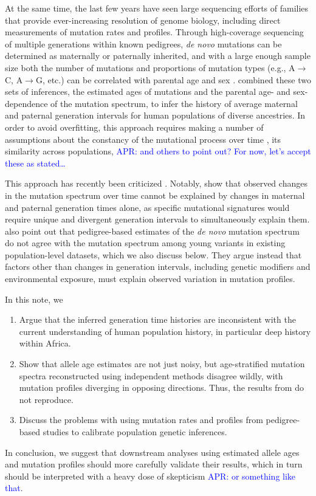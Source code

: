 \documentclass[]{article}
\newcommand{\aprcomment}[1]{{\textcolor{blue}{APR: #1}}}
\begin{document}
At the same time, the last few years have seen large sequencing efforts of
families that provide ever-increasing resolution of genome biology, including
direct measurements of mutation rates and profiles. Through high-coverage
sequencing of multiple generations within known pedigrees, \emph{de novo}
mutations can be determined as maternally or paternally inherited, and with a
large enough sample size both the number of mutations and proportions of
mutation types (e.g., A$\rightarrow$C, A$\rightarrow$G, etc.) can be correlated
with parental age and sex
\citep{jonsson2017parental,halldorsson2019characterizing}.
\citet{wang2023human} combined these two sets of inferences, the estimated ages
of mutations and the parental age- and sex-dependence of the mutation spectrum,
to infer the history of average maternal and paternal generation intervals for
human populations of diverse ancestries. In order to avoid overfitting, this
approach requires making a number of assumptions about the constancy of the
mutational process over time \cite{harris,dewitt}, its similarity across
populations, \aprcomment{and others to point out? For now, let's accept these
as stated\ldots}

This approach has recently been criticized \citep{gao2022limited}. Notably,
\citeauthor{gao2022limited} show that observed changes in the mutation spectrum
over time cannot be explained by changes in maternal and paternal generation
times alone, as specific mutational signatures would require unique and
divergent generation intervals to simultaneously explain them.
\citeauthor{gao2022limited} also point out that pedigree-based estimates of the
\emph{de novo} mutation spectrum do not agree with the mutation spectrum among
young variants in existing population-level datasets, which we also discuss
below. They argue instead that factors other than changes in generation
intervals, including genetic modifiers and environmental exposure, must explain
observed variation in mutation profiles.

In this note, we
\begin{enumerate}
    \item Argue that the inferred generation time histories are inconsistent
        with the current understanding of human population history, in
        particular deep history within Africa.
    \item Show that allele age estimates are not just noisy, but age-stratified
        mutation spectra reconstructed using independent methods disagree
        wildly, with mutation profiles diverging in opposing directions. Thus,
        the results from \citet{wang2023human} do not reproduce.
    \item Discuss the problems with using mutation rates and profiles from
        pedigree-based studies to calibrate population genetic inferences.
\end{enumerate}
In conclusion, we suggest that downstream analyses using estimated allele ages
and mutation profiles should more carefully validate their results, which in
turn should be interpreted with a heavy dose of skepticism \aprcomment{or
something like that}.
\end{document}
